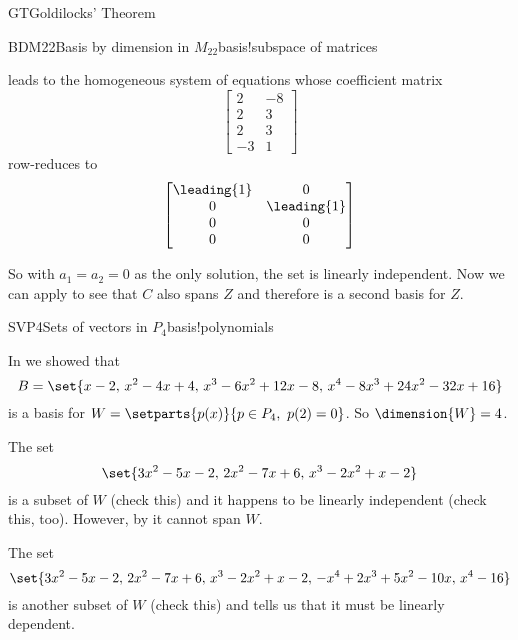 \begin{subsect}{GT}{Goldilocks' Theorem}
\begin{example}{BDM22}{Basis by dimension in $M_{22}$}{basis!subspace of matrices}
\begin{para}
%
leads to the homogeneous system of equations whose coefficient matrix
%
\begin{equation*}
\begin{bmatrix}
2&-8\\
2&3\\
2&3\\
-3&1
\end{bmatrix}
\end{equation*}
%
row-reduces to
%
\begin{equation*}
\begin{bmatrix}
\leading{1}&0\\
0&\leading{1}\\
0&0\\
0&0
\end{bmatrix}
\end{equation*}
\end{para}
%
\begin{para}So with $a_1=a_2=0$ as the only solution, the set is linearly independent.  Now we can apply  to see that $C$ also spans $Z$ and therefore is a second basis for $Z$.\end{para}
%
\end{example}
%
%
\begin{example}{SVP4}{Sets of vectors in $P_4$}{basis!polynomials}
\begin{para}In  we showed that
%
\begin{equation*}
B=\set{x-2,\,x^2-4x+4,\,x^3-6x^2+12x-8,\,x^4-8x^3+24x^2-32x+16}
\end{equation*}
%
is a basis for $W=\setparts{p(x)}{p\in P_4,\ p(2)=0}$.  So $\dimension{W}=4$.\end{para}
%
\begin{para}The set
%
\begin{equation*}
\set{3x^2-5x-2,\,2x^2-7x+6,\,x^3-2x^2+x-2}
\end{equation*}
%
is a subset of $W$ (check this) and it happens to be linearly independent (check this, too).  However, by  it cannot span $W$.\end{para}
%
\begin{para}The set
%
\begin{equation*}
\set{3x^2-5x-2,\,2x^2-7x+6,\,x^3-2x^2+x-2,\,-x^4+2x^3+5x^2-10x,\,x^4-16}
\end{equation*}
%
is another subset of $W$ (check this) and  tells us that it must be linearly dependent.\end{para}

\end{example}
\end{subsect}
